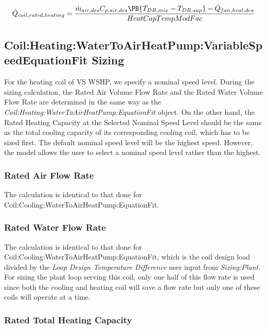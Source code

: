 \begin{equation}
  \dot{Q}_{coil,rated,heating} = \frac{\dot{m}_{air,des}C_{p,air,des}\PB{T_{DB,mix}-T_{DB,sup}}- \dot{Q}_{fan,heat,des}}{HeatCapTempModFac}
\end{equation}

\subsection{Coil:Heating:WaterToAirHeatPump:VariableSpeedEquationFit Sizing}\label{coilheatingwatertoairheatpumpvariablespeedequationfit-sizing}

For the heating coil of VS WSHP, we specify a nominal speed level. During the sizing calculation, the Rated Air Volume Flow Rate and the Rated Water Volume Flow Rate are determined in the same way as the \emph{Coil:Heating:WaterToAirHeatPump:EquationFit} object. On the other hand, the Rated Heating Capacity at the Selected Nominal Speed Level should be the same as the total cooling capacity of its corresponding cooling coil, which has to be sized first. The default nominal speed level will be the highest speed. However, the model allows the user to select a nominal speed level rather than the highest.

\subsubsection{Rated Air Flow Rate}\label{rated-air-flow-rate-3}

The calculation is identical to that done for Coil:Cooling:WaterToAirHeatPump:EquationFit.

\subsubsection{Rated Water Flow Rate}\label{rated-water-flow-rate-3}

The calculation is identical to that done for Coil:Cooling:WaterToAirHeatPump:EquationFit, which is the coil design load divided by the \emph{Loop Design Temperature Difference} user input from \emph{Sizing:Plant.} For sizing the plant loop serving this coil, only one half of this flow rate is used since both the cooling and heating coil will save a flow rate but only one of these coils will operate at a time.

\subsubsection{Rated Total Heating Capacity}\label{rated-total-heating-capacity-1}

